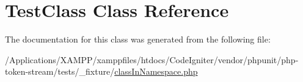\hypertarget{class_foo_1_1_bar_1_1_test_class}{}\section{Test\+Class Class Reference}
\label{class_foo_1_1_bar_1_1_test_class}


The documentation for this class was generated from the following file\+:\begin{DoxyCompactItemize}
\item 
/\+Applications/\+X\+A\+M\+P\+P/xamppfiles/htdocs/\+Code\+Igniter/vendor/phpunit/php-\/token-\/stream/tests/\+\_\+fixture/\mbox{\hyperlink{class_in_namespace_8php}{class\+In\+Namespace.\+php}}\end{DoxyCompactItemize}

